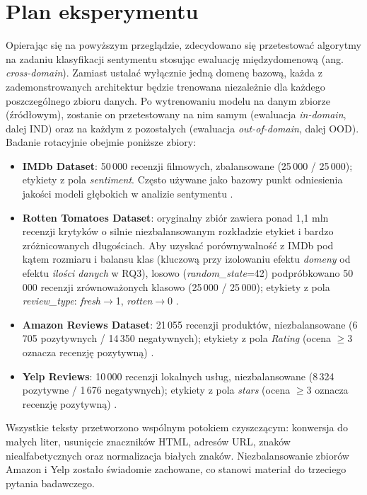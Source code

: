 \documentclass[runningheads]{llncs}
\begin{document}
\section*{Plan eksperymentu}
Opierając się na powyższym przeglądzie, zdecydowano się przetestować algorytmy na zadaniu klasyfikacji sentymentu stosując ewaluację międzydomenową (ang. \textit{cross-domain}). Zamiast ustalać wyłącznie jedną domenę bazową, każda z zademonstrowanych architektur będzie trenowana niezależnie dla każdego poszczególnego zbioru danych. Po wytrenowaniu modelu na danym zbiorze (źródłowym), zostanie on przetestowany na nim samym (ewaluacja \textit{in-domain}, dalej IND) oraz na każdym z pozostałych (ewaluacja \textit{out-of-domain}, dalej OOD). Badanie rotacyjnie obejmie poniższe zbiory:
\begin{itemize}
    \item \textbf{IMDb Dataset}: 50\,000 recenzji filmowych, zbalansowane (25\,000 / 25\,000); etykiety z pola \textit{sentiment}. Często używane jako bazowy punkt odniesienia jakości modeli głębokich w analizie sentymentu \cite{Yuan2026EmpiricalSO,imdb_dataset}.
    \item \textbf{Rotten Tomatoes Dataset}: oryginalny zbiór zawiera ponad 1{,}1 mln recenzji krytyków o silnie niezbalansowanym rozkładzie etykiet i bardzo zróżnicowanych długościach. Aby uzyskać porównywalność z IMDb pod kątem rozmiaru i balansu klas (kluczową przy izolowaniu efektu \emph{domeny} od efektu \emph{ilości danych} w RQ3), losowo (\textit{random\_state}=42) podpróbkowano 50\,000 recenzji zrównoważonych klasowo (25\,000 / 25\,000); etykiety z pola \textit{review\_type}: \textit{fresh}$\rightarrow$1, \textit{rotten}$\rightarrow$0 \cite{rotten_tomatoes}.
    \item \textbf{Amazon Reviews Dataset}: 21\,055 recenzji produktów, niezbalansowane (6\,705 pozytywnych / 14\,350 negatywnych); etykiety z pola \textit{Rating} (ocena $\geq 3$ oznacza recenzję pozytywną) \cite{amazon_reviews}.
    \item \textbf{Yelp Reviews}: 10\,000 recenzji lokalnych usług, niezbalansowane (8\,324 pozytywne / 1\,676 negatywnych); etykiety z pola \textit{stars} (ocena $\geq 3$ oznacza recenzję pozytywną) \cite{yelp_dataset}.
\end{itemize}
Wszystkie teksty przetworzono wspólnym potokiem czyszczącym: konwersja do małych liter, usunięcie znaczników HTML, adresów URL, znaków niealfabetycznych oraz normalizacja białych znaków. Niezbalansowanie zbiorów Amazon i Yelp zostało świadomie zachowane, co stanowi materiał do trzeciego pytania badawczego.
\end{document}

